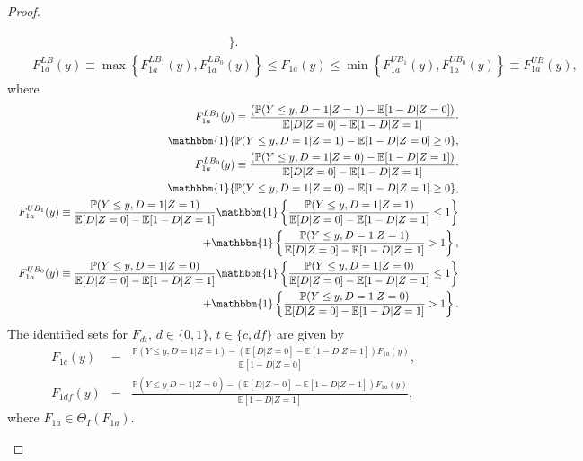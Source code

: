 \documentclass[12pt]{article}
\theoremstyle{plain}
\theoremstyle{definition}
\theoremstyle{remark}
\begin{document}
\begin{proof}
\begin{enumerate}
\begin{eqnarray}
   \Bigg\}.\nonumber
    \end{eqnarray}
\begin{eqnarray*}
   &&F_{1a}^{LB}(y)\equiv \max\left\{F_{1a}^{LB_1}(y),F_{1a}^{LB_0}(y)\right\} \leq F_{1a}(y) \leq \min\left\{F_{1a}^{UB_1}(y),F_{1a}^{UB_0}(y)\right\}\equiv F_{1a}^{UB}(y),
\end{eqnarray*}
where
\begin{eqnarray*}
    && F_{1a}^{LB_1}(y) \equiv \frac{(\mathbb P(Y\leq y, D=1 \vert Z=1)- \mathbb E[1-D\vert Z=0])}{\mathbb E[D\vert Z=0]-\mathbb E[1-D\vert Z=1]} \cdot\\
    && \qquad \mathbbm{1}\{\mathbb P(Y \leq y, D=1 \vert Z=1)- \mathbb E[1-D\vert Z=0]\geq 0\}, \\
   && F_{1a}^{LB_0}(y) \equiv \frac{(\mathbb P(Y\leq y, D=1 \vert Z=0)- \mathbb E[1-D\vert Z=1])}{\mathbb E[D\vert Z=0]-\mathbb E[1-D\vert Z=1]} \cdot\\
   && \qquad \mathbbm{1}\{\mathbb P(Y\leq y, D=1 \vert Z=0)- \mathbb E[1-D\vert Z=1]\geq 0\}, \\
   && F_{1a}^{UB_1}(y) \equiv \frac{\mathbb P(Y \leq y, D=1 \vert Z=1)}{\mathbb E[D\vert Z=0]-\mathbb E[1-D\vert Z=1]}\mathbbm{1}\left\{\frac{\mathbb P(Y \leq y, D=1 \vert Z=1)}{\mathbb E[D\vert Z=0]-\mathbb E[1-D\vert Z=1]} \leq 1\right\}\\
   && + \mathbbm{1}\left\{\frac{\mathbb P(Y \leq y, D=1 \vert Z=1)}{\mathbb E[D\vert Z=0]-\mathbb E[1-D\vert Z=1]} > 1\right\},\\
   && F_{1a}^{UB_0}(y) \equiv \frac{\mathbb P(Y \leq y, D=1 \vert Z=0)}{\mathbb E[D\vert Z=0]-\mathbb E[1-D\vert Z=1]}\mathbbm{1}\left\{\frac{\mathbb P(Y\leq y, D=1 \vert Z=0)}{\mathbb E[D\vert Z=0]-\mathbb E[1-D\vert Z=1]} \leq 1\right\}\\
   && + \mathbbm{1}\left\{\frac{\mathbb P(Y\leq y, D=1 \vert Z=0)}{\mathbb E[D\vert Z=0]-\mathbb E[1-D\vert Z=1]} > 1\right\}.
    \end{eqnarray*}
The identified sets for $F_{dt}$, $d\in\{0,1\}$, $t\in \{c,df\}$ are given by
  \begin{eqnarray*}
    F_{1c}(y) &=& \frac{\mathbb P(Y \leq y, D=1 \vert Z=1)-(\mathbb E[D\vert Z=0]-\mathbb E[1-D\vert Z=1]) F_{1a}(y)}{\mathbb E[1-D\vert Z=0]},\\
    F_{1df}(y) &=& \frac{\mathbb P(Y \leq y_, D=1 \vert Z=0)-(\mathbb E[D\vert Z=0]-\mathbb E[1-D\vert Z=1]) F_{1a}(y)}{\mathbb E[1-D\vert Z=1]},
  \end{eqnarray*}  
where $F_{1a} \in \Theta_I(F_{1a})$.



\end{enumerate}
\end{proof}
\end{document}
